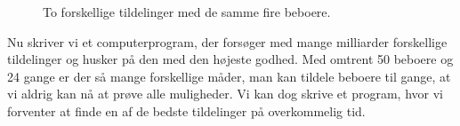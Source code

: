 \documentclass[article,oneside,11pt]{memoir}
\begin{document}
\begin{figure}[h]
\begin{center}
\caption{To forskellige tildelinger med de samme fire beboere.}

\end{center}
\end{figure}

Nu skriver vi et computerprogram, der forsøger med mange milliarder forskellige
tildelinger og husker på den med den højeste godhed. Med omtrent 50 beboere og
24 gange er der så mange forskellige måder, man kan tildele beboere til gange,
at vi aldrig kan nå at prøve alle muligheder. Vi kan dog skrive et program,
hvor vi forventer at finde en af de bedste tildelinger på overkommelig tid.
\end{document}

